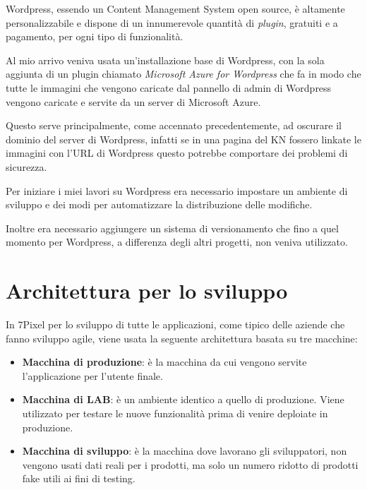 


Wordpress, essendo un Content Management System open source, è altamente personalizzabile e dispone
di un innumerevole quantità di \emph{plugin}, gratuiti e a pagamento, per ogni tipo di funzionalità.

Al mio arrivo veniva usata un'installazione base di Wordpress, con la sola aggiunta di un plugin chiamato \emph{Microsoft Azure 
for Wordpress} che fa in modo che tutte le immagini che vengono caricate dal pannello di admin di Wordpress
vengono caricate e servite da un server di Microsoft Azure.

Questo serve principalmente, come accennato precedentemente, ad oscurare il dominio del server di Wordpress,
infatti se in una pagina del KN fossero linkate le immagini con l'URL di Wordpress questo potrebbe 
comportare dei problemi di sicurezza.

Per iniziare i miei lavori su Wordpress era necessario impostare un ambiente di sviluppo e dei modi per automatizzare
la distribuzione delle modifiche.

Inoltre era necessario aggiungere un sistema di versionamento che fino a quel momento per Wordpress, a differenza
degli altri progetti, non veniva utilizzato.

\section{Architettura per lo sviluppo}

In 7Pixel per lo sviluppo di tutte le applicazioni, come tipico delle aziende che fanno sviluppo agile, viene usata la seguente architettura basata su tre macchine:
\begin{itemize}
\item {\bf Macchina di produzione}: è la macchina da cui vengono servite l'applicazione per l'utente finale.
\item {\bf Macchina di LAB}: è un ambiente identico a quello di produzione. Viene utilizzato per testare le nuove funzionalità
prima di venire deploiate in produzione.
\item {\bf Macchina di sviluppo}: è la macchina dove lavorano gli sviluppatori, non vengono usati dati reali per i prodotti, 
ma solo un numero ridotto di prodotti fake utili ai fini di testing.
\end{itemize}

